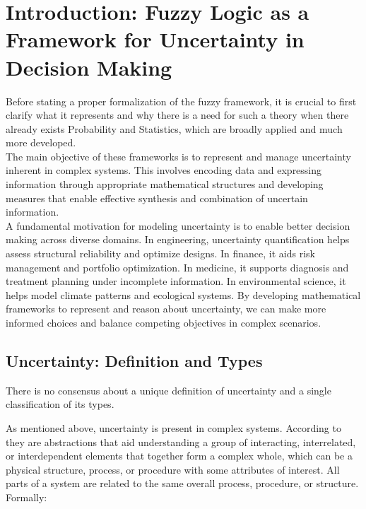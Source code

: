 \setcounter{chapter}{-1}
\chapter{Introduction: Fuzzy Logic as a Framework for Uncertainty in Decision Making}

Before stating a proper formalization of the fuzzy framework, it is crucial to first clarify what it represents and why there is a need for such a theory when there already exists Probability and Statistics, which are broadly applied and much more developed.\\

The main objective of these frameworks is to represent and manage uncertainty inherent in complex systems. This involves encoding data and expressing information through appropriate mathematical structures and developing measures that enable effective synthesis and combination of uncertain information.\\

A fundamental motivation for modeling uncertainty is to enable better decision making across diverse domains. In engineering, uncertainty quantification helps assess structural reliability and optimize designs. In finance, it aids risk management and portfolio optimization. In medicine, it supports diagnosis and treatment planning under incomplete information. In environmental science, it helps model climate patterns and ecological systems. By developing mathematical frameworks to represent and reason about uncertainty, we can make more informed choices and balance competing objectives in complex scenarios.\\

\section{Uncertainty: Definition and Types}

There is no consensus about a unique definition of uncertainty and a single classification of its types. 

As mentioned above, uncertainty is present in complex systems. According to \cite{UncertaintySciences} they are abstractions that aid understanding a group of interacting, interrelated, or interdependent elements that together form a complex whole, which can be a physical structure, process, or procedure with some attributes of interest. All parts of a system are related to the same overall process, procedure, or structure. Formally:

